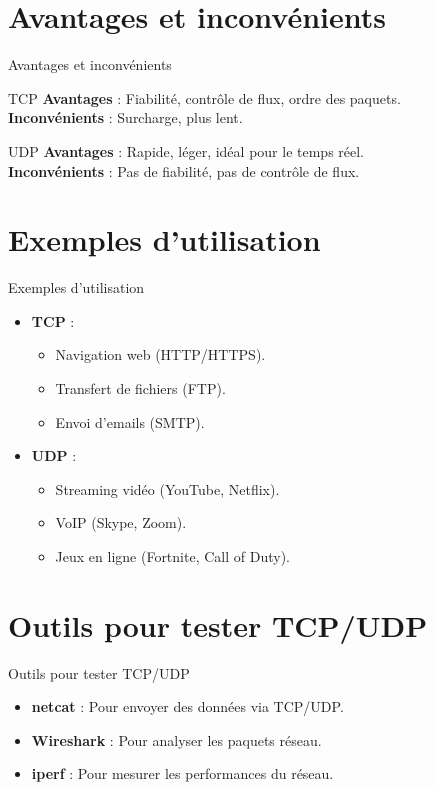 \documentclass{clbeamer2024}
\begin{document}
\section{Avantages et inconvénients}
\begin{frame}{Avantages et inconvénients}
	\begin{block}{TCP}
		\textbf{Avantages} : Fiabilité, contrôle de flux, ordre des paquets. \\
		\textbf{Inconvénients} : Surcharge, plus lent.
	\end{block}
	
	\begin{block}{UDP}
		\textbf{Avantages} : Rapide, léger, idéal pour le temps réel. \\
		\textbf{Inconvénients} : Pas de fiabilité, pas de contrôle de flux.
	\end{block}
\end{frame}

\section{Exemples d'utilisation}
\begin{frame}{Exemples d'utilisation}
	\begin{itemize}
		\item \textbf{TCP} :
		\begin{itemize}
			\item Navigation web (HTTP/HTTPS).
			\item Transfert de fichiers (FTP).
			\item Envoi d'emails (SMTP).
		\end{itemize}
		\item \textbf{UDP} :
		\begin{itemize}
			\item Streaming vidéo (YouTube, Netflix).
			\item VoIP (Skype, Zoom).
			\item Jeux en ligne (Fortnite, Call of Duty).
		\end{itemize}
	\end{itemize}
\end{frame}


\section{Outils pour tester TCP/UDP}
\begin{frame}{Outils pour tester TCP/UDP}
	\begin{itemize}
		\item \textbf{netcat} : Pour envoyer des données via TCP/UDP.
		\item \textbf{Wireshark} : Pour analyser les paquets réseau.
		\item \textbf{iperf} : Pour mesurer les performances du réseau.
	\end{itemize}
\end{frame}
\end{document}
